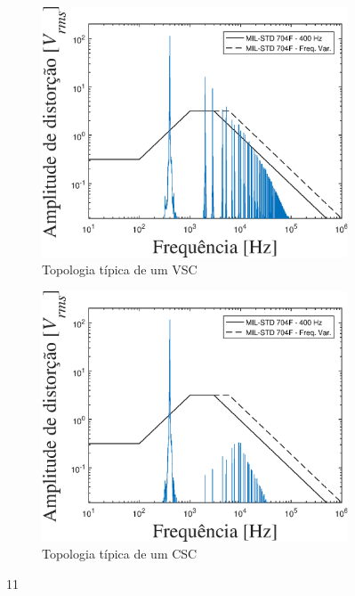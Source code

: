 \begin{figure}[!htb] %
	\centering
	\begin{subfigure}[b]{0.48\textwidth}
		\centering
		\includegraphics[width=\textwidth]{Cap4/Figuras/resultados_unfilt_11.eps}
		\caption{Topologia típica de um VSC} 
		\label{fig:resultados_unfilt_11.eps}
	\end{subfigure}%
		\hfill
	\begin{subfigure}[b]{0.48\textwidth}  
		\centering 
		\includegraphics[width=\textwidth]{Cap4/Figuras/resultados_filt_11.eps}
		\caption{Topologia típica de um CSC}    
		\label{fig:resultados_filt_11.eps}
	\end{subfigure}%
	\caption{11}
	\label{fig:11}
\end{figure}

